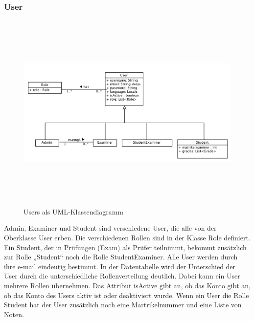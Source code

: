 \subsubsection{User}
\begin{figure}[H]
	\centering
  \includegraphics[width=\textwidth,height=10cm,keepaspectratio]{../UMLDiagramme/datenmodell/user.png}
	\caption{Users als UML-Klassendiagramm}
	\label{fig 1}
\end{figure}
Admin, Examiner und Student sind verschiedene User, die alle von der Oberklasse User erben.
Die verschiedenen Rollen sind in der Klasse Role definiert. Ein Student, der in Prüfungen (Exam) als Prüfer teilnimmt, bekommt zusätzlich zur Rolle „Student“ noch die Rolle
StudentExaminer.
Alle User werden durch ihre e-mail eindeutig bestimmt. 
In der Datentabelle wird der Unterschied der User durch die unterschiedliche Rollenverteilung deutlich. Dabei kann ein User mehrere Rollen übernehmen.
Das Attribut isActive gibt an, ob das Konto gibt an, ob das Konto des Users aktiv ist oder deaktiviert wurde.
Wenn ein User die Rolle Student hat der User zusätzlich noch eine Martrikelnummer und eine Liste von Noten.

